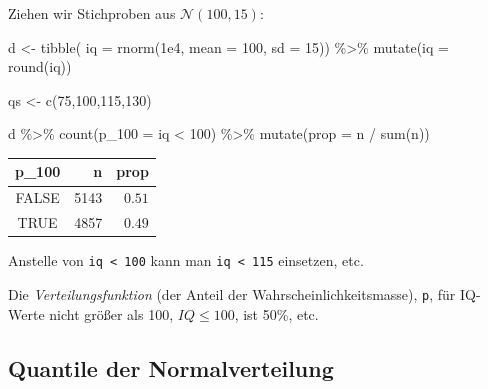 \documentclass[
  a4paper,
  DIV=11]{scrreprt}
\newenvironment{Shaded}{\begin{snugshade}}{\end{snugshade}}
\newcommand{\AttributeTok}[1]{\textcolor[rgb]{0.40,0.45,0.13}{#1}}
\newcommand{\DecValTok}[1]{\textcolor[rgb]{0.68,0.00,0.00}{#1}}
\newcommand{\FloatTok}[1]{\textcolor[rgb]{0.68,0.00,0.00}{#1}}
\newcommand{\FunctionTok}[1]{\textcolor[rgb]{0.28,0.35,0.67}{#1}}
\newcommand{\NormalTok}[1]{\textcolor[rgb]{0.00,0.23,0.31}{#1}}
\newcommand{\OtherTok}[1]{\textcolor[rgb]{0.00,0.23,0.31}{#1}}
\newcommand{\SpecialCharTok}[1]{\textcolor[rgb]{0.37,0.37,0.37}{#1}}
\theoremstyle{definition}
\theoremstyle{remark}
\begin{document}
Ziehen wir Stichproben aus \(\mathcal{N}(100,15)\):

\begin{Shaded}
\begin{Highlighting}[]
\NormalTok{d }\OtherTok{\textless{}{-}}
  \FunctionTok{tibble}\NormalTok{(}
    \AttributeTok{iq =} \FunctionTok{rnorm}\NormalTok{(}\FloatTok{1e4}\NormalTok{, }
               \AttributeTok{mean =} \DecValTok{100}\NormalTok{, }
               \AttributeTok{sd =} \DecValTok{15}\NormalTok{)) }\SpecialCharTok{\%\textgreater{}\%} 
  \FunctionTok{mutate}\NormalTok{(}\AttributeTok{iq =} \FunctionTok{round}\NormalTok{(iq))}

\NormalTok{qs }\OtherTok{\textless{}{-}} \FunctionTok{c}\NormalTok{(}\DecValTok{75}\NormalTok{,}\DecValTok{100}\NormalTok{,}\DecValTok{115}\NormalTok{,}\DecValTok{130}\NormalTok{)}

\NormalTok{d }\SpecialCharTok{\%\textgreater{}\%} 
  \FunctionTok{count}\NormalTok{(}\AttributeTok{p\_100 =}\NormalTok{ iq }\SpecialCharTok{\textless{}} \DecValTok{100}\NormalTok{) }\SpecialCharTok{\%\textgreater{}\%} 
  \FunctionTok{mutate}\NormalTok{(}\AttributeTok{prop =}\NormalTok{ n }\SpecialCharTok{/} \FunctionTok{sum}\NormalTok{(n)) }
\end{Highlighting}
\end{Shaded}

\begin{longtable}{crr}
\toprule
p\_100 & n & prop \\ 
\midrule
FALSE & 5143 & $0.51$ \\ 
TRUE & 4857 & $0.49$ \\ 
\bottomrule
\end{longtable}

Anstelle von \texttt{iq\ \textless{}\ 100} kann man
\texttt{iq\ \textless{}\ 115} einsetzen, etc.

Die \emph{Verteilungsfunktion} (der Anteil der
Wahrscheinlichkeitsmasse), \texttt{p}, für IQ-Werte nicht größer als
100, \(IQ\le100\), ist 50\%, etc.

\hypertarget{quantile-der-normalverteilung}{%
\subsection{Quantile der
Normalverteilung}\label{quantile-der-normalverteilung}}
\end{document}
